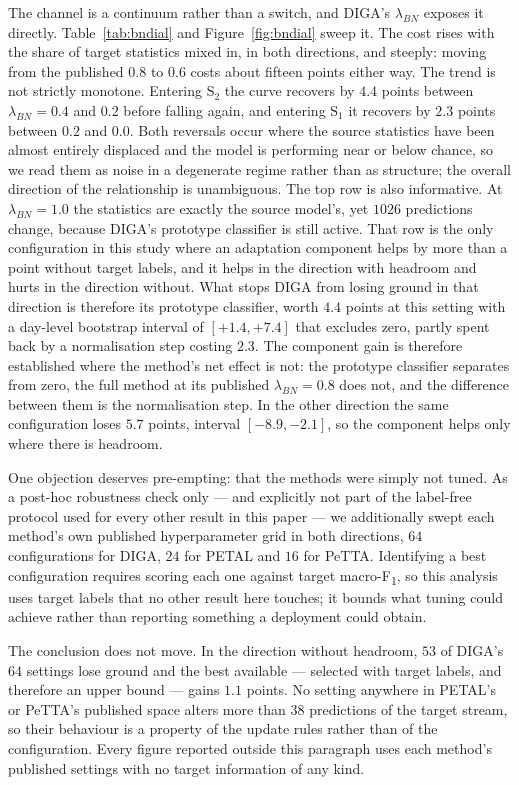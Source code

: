 \documentclass[a4paper,fleqn]{cas-dc}
\newcommand{\macf}{macro-F\textsubscript{1}}
\begin{document}
The channel is a continuum rather than a switch, and DIGA's $\lambda_{BN}$ exposes it
directly. Table~\ref{tab:bndial} and Figure~\ref{fig:bndial} sweep it. The cost rises
with the share of target statistics mixed in, in both directions, and steeply: moving from
the published $0.8$ to $0.6$ costs about fifteen points either way. The trend is not
strictly monotone. Entering $\text{S}_2$ the curve recovers by $4.4$ points between
$\lambda_{BN}=0.4$ and $0.2$ before falling again, and entering $\text{S}_1$ it recovers by
$2.3$ points between $0.2$ and $0.0$. Both reversals occur where the source statistics have
been almost entirely displaced and the model is performing near or below chance, so we read
them as noise in a degenerate regime rather than as structure; the overall direction of the
relationship is unambiguous. The top row is also informative. At
$\lambda_{BN}=1.0$ the statistics are exactly the source model's, yet $1026$ predictions
change, because DIGA's prototype classifier is still active. That row is the only
configuration in this study where an adaptation component helps by more than a point
without target labels, and it helps in the direction with headroom and hurts in the
direction without. What stops DIGA from losing ground in that direction is therefore its prototype
classifier, worth $4.4$ points at this setting with a day-level bootstrap interval of
$[+1.4,+7.4]$ that excludes zero, partly spent back by a normalisation step costing $2.3$.
The component gain is therefore established where the method's net effect is not: the
prototype classifier separates from zero, the full method at its published
$\lambda_{BN}=0.8$ does not, and the difference between them is the normalisation step. In
the other direction the same configuration loses $5.7$ points, interval
$[-8.9,-2.1]$, so the component helps only where there is headroom.

One objection deserves pre-empting: that the methods were simply not tuned. As a
post-hoc robustness check only --- and explicitly not part of the label-free protocol used
for every other result in this paper --- we additionally swept each method's own published
hyperparameter grid in both directions, $64$ configurations for DIGA, $24$ for PETAL and
$16$ for PeTTA. Identifying a best configuration requires scoring each one against target
\macf, so this analysis uses target labels that no other result here touches; it bounds
what tuning could achieve rather than reporting something a deployment could obtain.

The conclusion does not move. In the direction without headroom, $53$ of DIGA's $64$
settings lose ground and the best available --- selected with target labels, and therefore
an upper bound --- gains $1.1$ points. No setting anywhere in PETAL's or PeTTA's published
space alters more than $38$ predictions of the target stream, so their behaviour is a property of the
update rules rather than of the configuration. Every figure reported outside this paragraph
uses each method's published settings with no target information of any kind.
\end{document}
